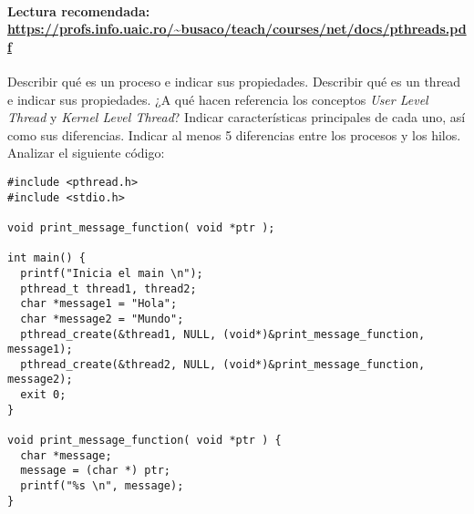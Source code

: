 \paragraph{Lectura recomendada: \url{https://profs.info.uaic.ro/~busaco/teach/courses/net/docs/pthreads.pdf}}

\begin{questions}

\question Describir qué es un proceso e indicar sus propiedades.
\question Describir qué es un thread e indicar sus propiedades. ¿A qué hacen
          referencia los conceptos \textit{User Level Thread} y \textit{Kernel Level Thread}?
          Indicar características principales de cada uno, así como sus diferencias.
\question Indicar al menos 5 diferencias entre los procesos y los hilos.
\question Analizar el siguiente código:
  \begin{lstlisting}
#include <pthread.h>
#include <stdio.h>

void print_message_function( void *ptr );

int main() {
  printf("Inicia el main \n");
  pthread_t thread1, thread2;
  char *message1 = "Hola";
  char *message2 = "Mundo";
  pthread_create(&thread1, NULL, (void*)&print_message_function, message1);
  pthread_create(&thread2, NULL, (void*)&print_message_function, message2);
  exit 0;
}

void print_message_function( void *ptr ) {
  char *message;
  message = (char *) ptr;
  printf("%s \n", message);
}
  \end{lstlisting}

\end{questions}
